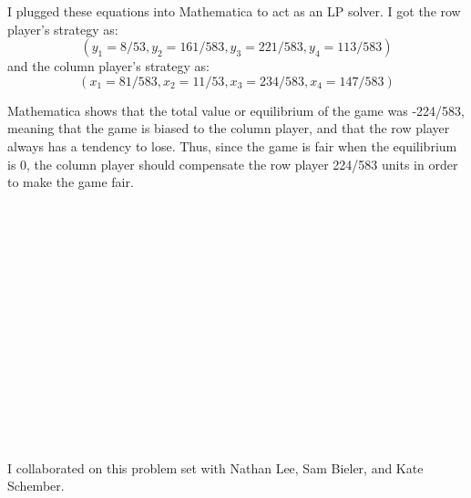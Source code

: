\documentclass[11pt]{article}
\begin{document}
\begin{enumerate}
I plugged these equations into Mathematica to act as an LP solver. I got the row player's strategy as:
\begin{equation*}
  (y_1 = 8/53, y_2 = 161/583, y_3 = 221/583, y_4 = 113/583) 
\end{equation*}
and the column player's strategy as:
\begin{equation*}
  (x_1 = 81/583, x_2 = 11/53, x_ 3 = 234/583, x_4 = 147/583)
\end{equation*}

Mathematica shows that the total value or equilibrium of the game was -224/583, meaning that the game is biased to the column player, and that the row player always has a tendency to lose. Thus, since the game is fair when the equilibrium is 0, the column player should compensate the row player 224/583 units in order to make the game fair. 
\\\\\\\\\\\\\\\\\\\\\\\\\\\\\\\\

I collaborated on this problem set with Nathan Lee, Sam Bieler, and Kate Schember. 


\end{enumerate}
\end{document}
